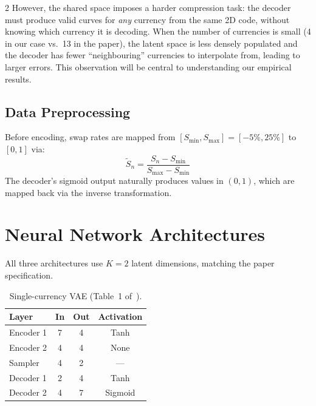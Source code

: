\documentclass[10pt,a4paper]{article}
\theoremstyle{plain}
\theoremstyle{definition}
\begin{document}
\begin{multicols}{2}
However, the shared space imposes a harder compression task: the decoder must produce valid curves for \textit{any} currency from the same 2D code, without knowing which currency it is decoding. When the number of currencies is small (4 in our case vs.\ 13 in the paper), the latent space is less densely populated and the decoder has fewer ``neighbouring'' currencies to interpolate from, leading to larger errors. This observation will be central to understanding our empirical results.

\subsection{Data Preprocessing}

Before encoding, swap rates are mapped from $[S_{\min}, S_{\max}] = [-5\%, 25\%]$ to $[0, 1]$ via:
\begin{equation}
\tilde{S}_n = \frac{S_n - S_{\min}}{S_{\max} - S_{\min}}
\end{equation}
The decoder's sigmoid output naturally produces values in $(0,1)$, which are mapped back via the inverse transformation.

\section{Neural Network Architectures}\label{sec:architecture}

All three architectures use $K=2$ latent dimensions, matching the paper specification.

\begin{table}[H]
\centering
\caption{Single-currency VAE (Table~1 of~\cite{sokol2022}).}\label{tab:sc_vae}
\begin{tabular}{lccc}
\toprule
Layer & In & Out & Activation \\
\midrule
Encoder 1 & 7 & 4 & Tanh \\
Encoder 2 & 4 & 4 & None \\
Sampler & 4 & 2 & --- \\
Decoder 1 & 2 & 4 & Tanh \\
Decoder 2 & 4 & 7 & Sigmoid \\
\bottomrule
\end{tabular}
\end{table}


\end{multicols}
\end{document}
